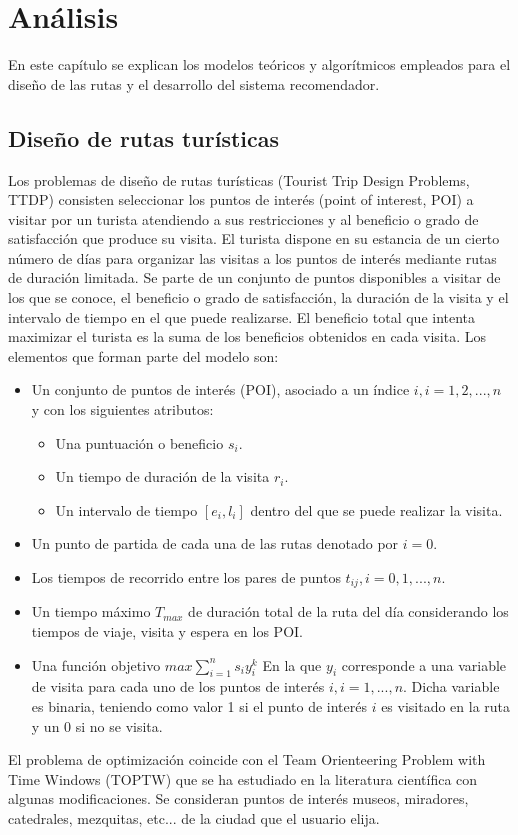\chapter{Análisis}
En este capítulo se explican los modelos teóricos y algorítmicos empleados para el diseño de las rutas y el desarrollo del sistema recomendador.
\section[Diseño de rutas turísticas]{Diseño de rutas turísticas}
Los problemas de diseño de rutas turísticas (Tourist Trip Design Problems, TTDP) consisten seleccionar los puntos de interés (point of interest, POI) a visitar por un turista atendiendo a sus restricciones y al beneficio o grado de satisfacción que produce su visita. El turista dispone en su estancia de un cierto número de días para organizar las visitas a los puntos de interés mediante rutas de duración limitada. Se parte de un conjunto de puntos disponibles a visitar de los que se conoce, el beneficio o grado de satisfacción, la duración de la visita y el intervalo de tiempo en el que puede realizarse. El beneficio total que intenta maximizar el turista es la suma de los beneficios obtenidos en cada visita.\newline
Los elementos que forman parte del modelo son:
\begin{itemize}
	\item Un conjunto de puntos de interés (POI), asociado a un índice $i, i=1,2,...,n$ y con los siguientes atributos:
	\begin{itemize}
		\item Una puntuación o beneficio $s_i$.
		\item Un tiempo de duración de la visita $r_i$.
		\item Un intervalo de tiempo $[e_i,l_i]$ dentro del que se puede realizar la visita.
	\end{itemize}
	\item Un punto de partida de cada una de las rutas denotado por $i=0$.
	\item Los tiempos de recorrido entre los pares de puntos $t_{ij}, i=0,1,...,n$.
	\item Un tiempo máximo $T_{max}$ de duración total de la ruta del día considerando los tiempos de viaje, visita y espera en los POI.
	\item Una función objetivo $max \sum_{i=1}^{n}s_iy_i^k$ \newline
	En la que $y_i$ corresponde a una variable de visita para cada uno de los puntos de interés $i, i=1,...,n$. Dicha variable es binaria, teniendo como valor 1 si el punto de interés $i$ es visitado en la ruta y un 0 si no se visita.
\end{itemize}
El problema de optimización coincide con el Team Orienteering Problem with Time Windows (TOPTW) que se ha estudiado en la literatura científica con algunas modificaciones. Se consideran puntos de interés museos, miradores, catedrales, mezquitas, etc... de la ciudad que el usuario elija.

